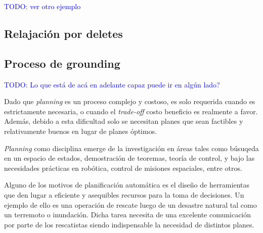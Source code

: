 \textcolor{blue}{TODO: ver otro ejemplo}

\subsection{Relajación por deletes}

\subsection{Proceso de grounding}



\textcolor{blue}{TODO: Lo que está de acá en adelante capaz puede ir en algún lado?}

Dado que \emph{planning} es un proceso complejo y costoso, es solo requerida
cuando es estrictamente necesaria, o cuando el \emph{trade-off} costo beneficio
es realmente a favor. Además, debido a esta dificultad solo se necesitan planes
que sean factibles y relativamente buenos en lugar de planes óptimos.

\emph{Planning} como disciplina emerge de la investigación en áreas tales como
búsuqeda en un espacio de estados, demostración de teoremas, teoría de control,
y bajo las necesidades prácticas en robótica, control de misiones espaciales,
entre otros.

Alguno de los motivos de planificación automática es el diseño de herramientas
que den lugar a eficiente y asequibles recursos para la toma de decisiones. Un
ejemplo de ello es una operación de rescate luego de un desastre natural tal
como un terremoto o inundación. Dicha tarea necesita de una excelente
comunicación por parte de los rescatistas siendo indispensable la necesidad de
distintos planes.